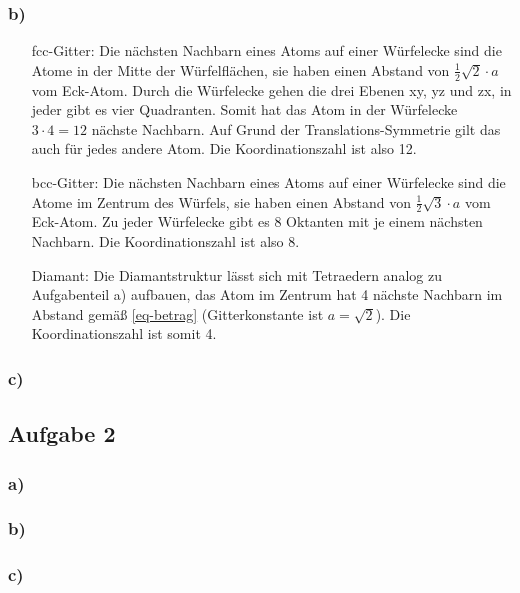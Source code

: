 \documentclass[11pt]{article}
\begin{document}
\subsubsection*{b)}
\begin{itemize}
  \item [fcc-Gitter:] Die nächsten Nachbarn eines Atoms auf einer Würfelecke sind
  die Atome in der Mitte der Würfelflächen, sie haben einen Abstand von
  $\frac{1}{2} \sqrt{2} \cdot a$  vom Eck-Atom. Durch die Würfelecke gehen
  die drei Ebenen xy, yz und zx, in jeder
  gibt es vier Quadranten. Somit hat das Atom in der Würfelecke $3 \cdot 4 = 12$
  nächste Nachbarn. Auf Grund der Translations-Symmetrie gilt das auch für jedes
  andere Atom. Die Koordinationszahl ist also 12.
    \item [bcc-Gitter:] Die nächsten Nachbarn eines Atoms auf einer Würfelecke sind
  die Atome im Zentrum des Würfels, sie haben einen Abstand von $\frac{1}{2} \sqrt{3} \cdot a$
  vom Eck-Atom. Zu jeder Würfelecke gibt es 8 Oktanten mit je einem nächsten Nachbarn.
  Die Koordinationszahl ist also 8.
  \item[Diamant:] Die Diamantstruktur lässt sich mit Tetraedern analog zu
  Aufgabenteil a) aufbauen, das Atom im Zentrum hat 4 nächste Nachbarn im Abstand
  gemäß \eqref{eq-betrag} (Gitterkonstante ist $a = \sqrt{2}$).
  Die Koordinationszahl ist somit 4.
\end{itemize}

\subsubsection*{c)}

\subsection*{Aufgabe 2}

\subsubsection*{a)}

\subsubsection*{b)}

\subsubsection*{c)}
\end{document}
